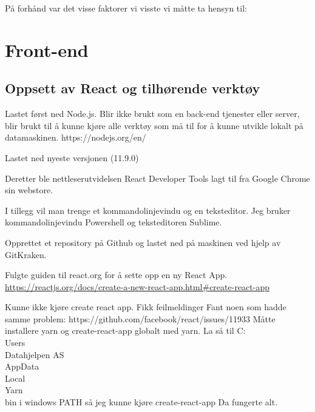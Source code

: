 



På forhånd var det visse faktorer vi visste vi måtte ta hensyn til:


\section{Front-end}

\subsection{Oppsett av React og tilhørende verktøy}

Lastet først ned Node.js. Blir ikke brukt som en back-end tjenester eller server, blir brukt til å kunne kjøre alle verktøy som må til for å kunne utvikle lokalt på datamaskinen. https://nodejs.org/en/

Lastet ned nyeste versjonen (11.9.0)

Deretter ble nettleserutvidelsen React Developer Tools lagt til fra Google Chrome sin webstore.

I tillegg vil man trenge et kommandolinjevindu og en teksteditor. Jeg bruker kommandolinjevindu Powershell og teksteditoren Sublime.

Opprettet et repository på Github og lastet ned på maskinen ved hjelp av GitKraken. 

Fulgte guiden til react.org for å sette opp en ny React App. \url{https://reactjs.org/docs/create-a-new-react-app.html\#create-react-app}



Kunne ikke kjøre create react app. Fikk feilmeldinger
Fant noen som hadde samme problem: https://github.com/facebook/react/issues/11933
Måtte installere yarn og create-react-app globalt med yarn.
La så til C:\\Users\\Datahjelpen AS\\AppData\\Local\\Yarn\\bin i windows PATH så jeg kunne kjøre create-react-app
Da fungerte alt.


\clearpage